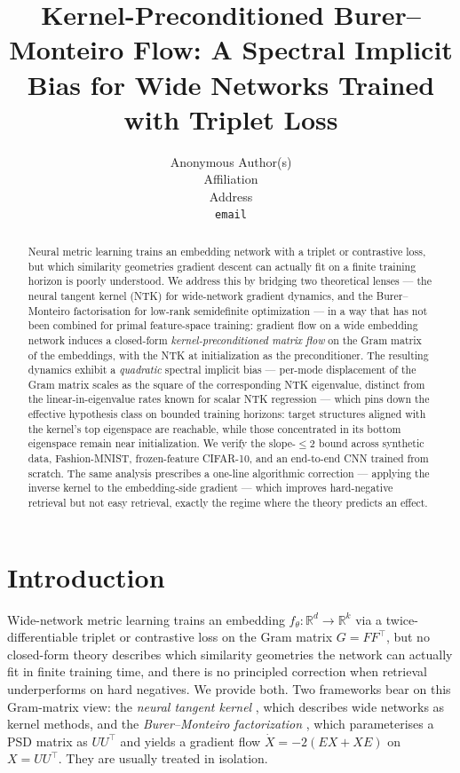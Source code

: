 \documentclass{article}
\title{Kernel-Preconditioned Burer--Monteiro Flow: A Spectral Implicit Bias for Wide Networks Trained with Triplet Loss}
\author{%
  Anonymous Author(s) \\
  Affiliation \\
  Address \\
  \texttt{email}
}
\newcommand{\R}{\mathbb{R}}
\begin{document}
\maketitle

\begin{abstract}
Neural metric learning trains an embedding network with a triplet or
contrastive loss, but which similarity geometries gradient descent can
actually fit on a finite training horizon is poorly understood. We
address this by bridging two theoretical lenses --- the neural tangent
kernel (NTK) for wide-network gradient dynamics, and the
Burer--Monteiro factorisation for low-rank semidefinite optimization
--- in a way that has not been combined for primal feature-space
training: gradient flow on a wide embedding network induces a closed-form
\emph{kernel-preconditioned matrix flow} on the Gram matrix of the
embeddings, with the NTK at initialization as the preconditioner. The
resulting dynamics exhibit a \emph{quadratic} spectral implicit bias
--- per-mode displacement of the Gram matrix scales as the square of
the corresponding NTK eigenvalue, distinct from the linear-in-eigenvalue
rates known for scalar NTK regression --- which pins down the effective
hypothesis class on bounded training horizons: target structures aligned
with the kernel's top eigenspace are reachable, while those concentrated
in its bottom eigenspace remain near initialization. We verify the
slope-$\leq 2$ bound across synthetic data, Fashion-MNIST,
frozen-feature CIFAR-10, and an end-to-end CNN trained from scratch.
The same analysis prescribes a one-line algorithmic correction ---
applying the inverse kernel to the embedding-side gradient --- which
improves hard-negative retrieval but not easy retrieval, exactly the
regime where the theory predicts an effect.
\end{abstract}

\section{Introduction}
\label{sec:intro}

Wide-network metric learning trains an embedding
$f_\theta: \R^d \to \R^k$ via a twice-differentiable triplet or
contrastive loss on the Gram matrix $G = FF^\top$, but no closed-form
theory describes which similarity geometries the network can actually
fit in finite training time, and there is no principled correction
when retrieval underperforms on hard negatives. We provide both. Two
frameworks bear on this Gram-matrix view: the \emph{neural tangent
kernel} \citep{jacot2018neural,lee2019wide}, which describes wide
networks as kernel methods, and the \emph{Burer--Monteiro
factorization} \citep{burer2003nonlinear,burer2005local}, which
parameterises a PSD matrix as $UU^\top$ and yields a gradient flow
$\dot X = -2(EX+XE)$ on $X = UU^\top$. They are usually treated in
isolation.
\end{document}
